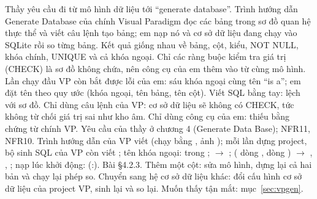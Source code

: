 {Thầy yêu cầu đi từ mô hình dữ liệu tới ``generate database''. Trình hướng dẫn Generate Database của chính Visual Paradigm đọc các bảng trong sơ đồ quan hệ thực thể và viết câu lệnh tạo bảng; em nạp nó và cơ sở dữ liệu đang chạy vào SQLite rồi so từng bảng. Kết quả giống nhau về bảng, cột, kiểu, NOT NULL, khóa chính, UNIQUE và cả khóa ngoại. Chỉ các ràng buộc kiểm tra giá trị (CHECK) là sơ đồ không chứa, nên công cụ của em thêm vào từ cùng mô hình. Lần chạy đầu VP còn bắt được lỗi của em: sáu khóa ngoại cùng tên ``is a''; em đặt tên theo quy ước  (khóa ngoại, tên bảng, tên cột).}
{Viết SQL bằng tay: lệch với sơ đồ. Chỉ dùng câu lệnh của VP: cơ sở dữ liệu sẽ không có CHECK, tức không từ chối giá trị sai như kho âm. Chỉ dùng công cụ của em: thiếu bằng chứng từ chính VP.}
{Yêu cầu của thầy ở chương 4 (Generate Data Base); NFR11, NFR10.}
{Trình hướng dẫn của VP viết  (chạy bằng , ảnh ); mỗi lần dựng project, bộ sinh SQL của VP còn viết ; tên khóa ngoại:  trong ;  $\to$ ;  ( dòng \dongGenCreate,  dòng \dongGenValidate) $\to$ , , ; nạp lúc khởi động:  (:\dongDbInit). Bài §4.2.3.}
{Thêm một cột: sửa mô hình, dựng lại cả hai bản và chạy lại phép so. Chuyển sang hệ cơ sở dữ liệu khác: đổi cấu hình cơ sở dữ liệu của project VP, sinh lại và so lại. Muốn thấy tận mắt: mục~\ref{sec:vpgen}.}
